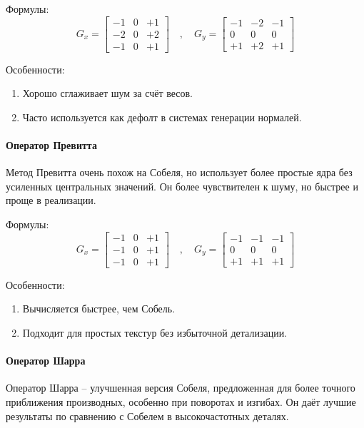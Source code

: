 Формулы:
\[
G_x =
\begin{bmatrix}
	-1 & 0 & +1 \\
	-2 & 0 & +2 \\
	-1 & 0 & +1
\end{bmatrix}
\quad , \quad
G_y =
\begin{bmatrix}
	-1 & -2 & -1 \\
	0 & 0 & 0 \\
	+1 & +2 & +1
\end{bmatrix}
\]

Особенности:
\begin{enumerate}
	\item Хорошо сглаживает шум за счёт весов.
	\item Часто используется как дефолт в системах генерации нормалей.
\end{enumerate}
\paragraph{Оператор Превитта}

Метод Превитта очень похож на Собеля, но использует более простые ядра без усиленных центральных значений. Он более чувствителен к шуму, но быстрее и проще в реализации.

Формулы:
\[
G_x =
\begin{bmatrix}
	-1 & 0 & +1 \\
	-1 & 0 & +1 \\
	-1 & 0 & +1
\end{bmatrix}
\quad , \quad
G_y =
\begin{bmatrix}
	-1 & -1 & -1 \\
	0 & 0 & 0 \\
	+1 & +1 & +1
\end{bmatrix}
\]

Особенности:
\begin{enumerate}
	\item Вычисляется быстрее, чем Собель.
	\item Подходит для простых текстур без избыточной детализации.
\end{enumerate}
\paragraph{Оператор Шарра}

Оператор Шарра -- улучшенная версия Собеля, предложенная для более точного приближения производных, особенно при поворотах и изгибах. Он даёт лучшие результаты по сравнению с Собелем в высокочастотных деталях.

